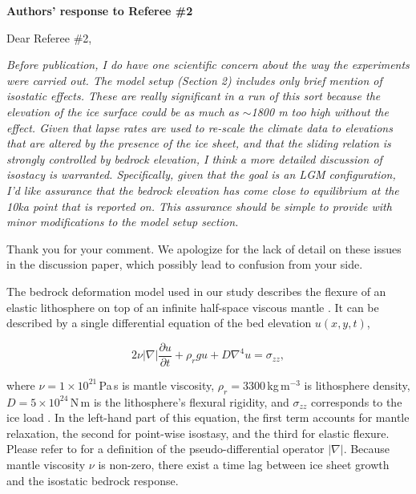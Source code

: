 \documentclass[10pt]{article}
\begin{document}
\textbf{Authors' response to Referee {\#}2}
\bigskip


\def\doi#1{doi:\allowbreak\href{http://dx.doi.org/#1}{#1}}
\def\referee#1{\bigskip\textcolor{journalname}{\textit{#1}}}

Dear Referee {\#}2,

\referee{Before publication, I do have one scientific concern about the way the experiments were carried out. The model setup (Section 2) includes only brief mention of isostatic effects. These are really significant in a run of this sort because the elevation of the ice surface could be as much as $\sim$1800 m too high without the effect. Given that lapse rates are used to re-scale the climate data to elevations that are altered by the presence of the ice sheet, and that the sliding relation is strongly controlled by bedrock elevation, I think a more detailed discussion of isostacy is warranted. Specifically, given that the goal is an LGM configuration, I'd like assurance that the bedrock elevation has come close to equilibrium at the 10ka point that is reported on. This assurance should be simple to provide with minor modifications to the model setup section.}

Thank you for your comment. We apologize for the lack of detail on these issues in the discussion paper, which possibly lead to confusion from your side.

The bedrock deformation model used in our study describes the flexure of an elastic lithosphere on top of an infinite half-space viscous mantle \citep{lingle-clark-1985}. It can be described by a single differential equation of the bed elevation $u(x, y, t)$,

\begin{equation}
    2 \nu |\nabla| \frac{\partial u}{\partial t}
    + \rho_r g u
    + D \nabla^4 u
    = \sigma_{zz},
\end{equation}

where $\nu=1\times10^{21}$\,Pa\,s is mantle viscosity, $\rho_r = 3300$\,kg\,m$^{-3}$ is lithosphere density, $D=5\times10^{24}$\,N\,m is the lithosphere's flexural rigidity, and $\sigma_{zz}$ corresponds to the ice load \citet{bueler-etal-2007}. In the left-hand part of this equation, the first term accounts for mantle relaxation, the second for point-wise isostasy, and the third for elastic flexure. Please refer to \citet{bueler-etal-2007} for a definition of the pseudo-differential operator $|\nabla|$. Because mantle viscosity $\nu$ is non-zero, there exist a time lag between ice sheet growth and the isostatic bedrock response.
\end{document}
